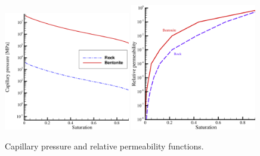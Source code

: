 \begin{figure}[!htb]
\begin{center}
\includegraphics[width=0.49\textwidth]{chapter_14/figures/fig_14_2_18_a}
\includegraphics[width=0.49\textwidth]{chapter_14/figures/fig_14_2_18_b}
\end{center}
\caption{Capillary pressure and relative permeability functions.}
\label{fig:cp_cp}
\end{figure}

